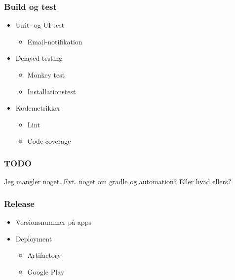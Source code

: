\begin{frame}
    \frametitle{Build og test}
\begin{itemize}
  \item Unit- og UI-test
    \begin{itemize}
    \item Email-notifikation
    \end{itemize}
  \item Delayed testing
    \begin{itemize}
    \item Monkey test
    \item Installationstest
    \end{itemize}
  \item Kodemetrikker
    \begin{itemize}
    \item Lint
    \item Code coverage
    \end{itemize}
  \end{itemize}
\end{frame}

\begin{frame}
    \frametitle{TODO}
    Jeg mangler noget. Evt. noget om gradle og automation? Eller hvad ellers?
  \end{frame}

\begin{frame}
    \frametitle{Release}
    \begin{itemize}
    \item Versionsnummer på apps
    \item Deployment
      \begin{itemize}
      \item Artifactory
      \item Google Play
      \end{itemize}
    \end{itemize}
  \end{frame}
